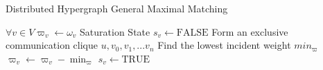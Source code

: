 \begin{algorithm}
\caption{Distributed Hypergraph General Maximal Matching} 
\begin{algorithmic}
\REQUIRE $\forall v \in V \varpi_v \leftarrow \omega_v$
\REQUIRE Saturation State $s_v \leftarrow \text{FALSE}$ 
\STATE Form an exclusive communication clique $u, v_0, v_1, ... v_n$
\STATE Find the lowest incident weight $min_\varpi$
\STATE $\varpi_v \leftarrow \varpi_v - \min_\varpi$
\STATE $s_v \leftarrow \text{TRUE}$ 
\ENDIF
\ENDFOR
\ENDIF
\ENDFOR
\ENDFOR
\end{algorithmic}
\label{alg:dhgmm}
\end{algorithm}